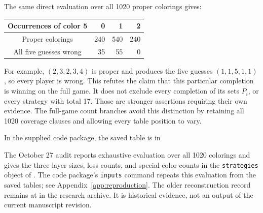 The same direct evaluation over all 1020 proper colorings gives:
\begin{center}
\begin{tabular}{@{}crrr@{}}
\toprule
Occurrences of color 5&0&1&2\\
\midrule
Proper colorings&240&540&240\\
All five guesses wrong&35&55&0\\
\bottomrule
\end{tabular}
\end{center}
For example, $(2,3,2,3,4)$ is proper and produces the five guesses
$(1,1,5,1,1)$, so every player is wrong. This refutes the claim that
this particular completion is winning on the full game. It does not
exclude every completion of its sets $P_i$, or every strategy with total
17. Those are stronger assertions requiring their own evidence. The
full-game count branches avoid this distinction by retaining all 1020
coverage clauses and allowing every table position to vary.

In the supplied code package, the saved table is  in
\begin{quote}\small\raggedright
{}
\end{quote}
The October 27 audit reports exhaustive evaluation over all 1020 colorings
and gives the three layer sizes, loss counts, and special-color counts in the \texttt{strategies}
object of . The code
package's \texttt{inputs} command repeats this evaluation from the saved
tables; see Appendix~\ref{app:reproduction}. The older reconstruction
record remains at
in the research archive. It is historical evidence, not an output of the
current manuscript revision.
